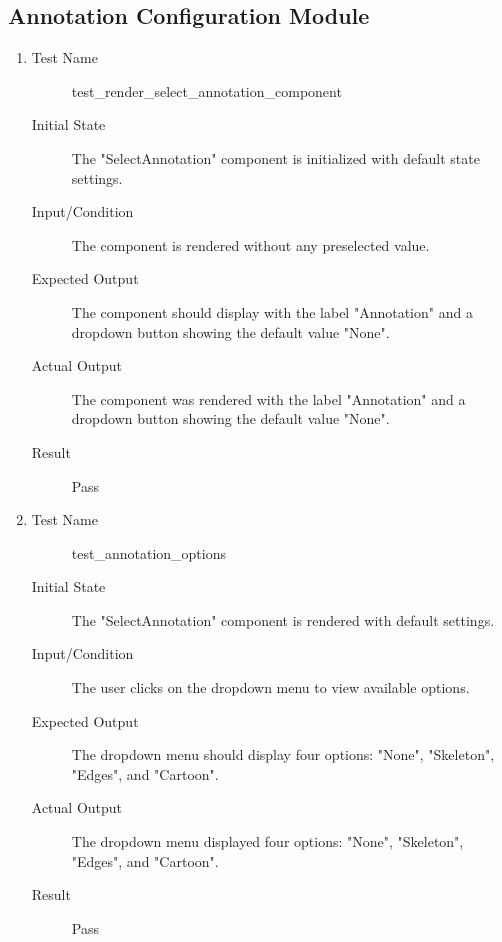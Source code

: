 \documentclass[12pt, titlepage]{article}
\begin{document}
\subsection{Annotation Configuration Module}
\begin{enumerate}[UT-AC1]
\item \label{UT-AC1}
  \begin{description}
  \item[Test Name] test\_render\_select\_annotation\_component
  \item[Initial State] The "SelectAnnotation" component is initialized with
    default state settings.
  \item[Input/Condition] The component is rendered without any preselected
    value.
  \item[Expected Output] The component should display with the label
    "Annotation" and a dropdown button showing the default value "None".
  \item[Actual Output] The component was rendered with the label "Annotation"
    and a dropdown button showing the default value "None".
  \item[Result] Pass
  \end{description}
\item \label{UT-AC2}
  \begin{description}
  \item[Test Name] test\_annotation\_options
  \item[Initial State] The "SelectAnnotation" component is rendered with default
    settings.
  \item[Input/Condition] The user clicks on the dropdown menu to view available
    options.
  \item[Expected Output] The dropdown menu should display four options: "None",
    "Skeleton", "Edges", and "Cartoon".
  \item[Actual Output] The dropdown menu displayed four options: "None",
    "Skeleton", "Edges", and "Cartoon".
  \item[Result] Pass
  \end{description}
\end{enumerate}
\end{document}
